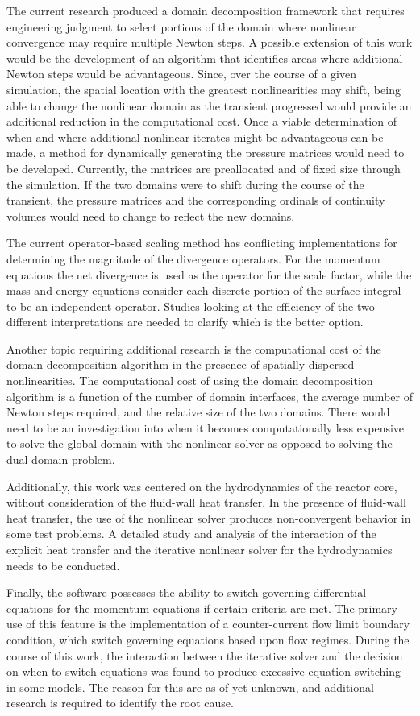 The current research produced a domain decomposition framework that requires engineering judgment to select portions of the domain where nonlinear convergence may require multiple Newton steps.
A possible extension of this work would be the development of an algorithm that identifies areas where additional Newton steps would be advantageous.
Since, over the course of a given simulation, the spatial location with the greatest nonlinearities may shift, being able to change the nonlinear domain as the transient progressed would provide an additional reduction in the computational cost.
Once a viable determination of when and where additional nonlinear iterates might be advantageous can be made, a method for dynamically generating the pressure matrices would need to be developed.
Currently, the matrices are preallocated and of fixed size through the simulation.
If the two domains were to shift during the course of the transient, the pressure matrices and the corresponding ordinals of continuity volumes would need to change to reflect the new domains.

The current operator-based scaling method has conflicting implementations for determining the magnitude of the divergence operators.
For the momentum equations the net divergence is used as the operator for the scale factor, while the mass and energy equations consider each discrete portion of the surface integral to be an independent operator.
Studies looking at the efficiency of the two different interpretations are needed to clarify which is the better option.

Another topic requiring additional research is the computational cost of the domain decomposition algorithm in the presence of spatially dispersed nonlinearities. 
The computational cost of using the domain decomposition algorithm is a function of the number of domain interfaces, the average number of Newton steps required, and the relative size of the two domains.
There would need to be an investigation into when it becomes computationally less expensive to solve the global domain with the nonlinear solver as opposed to solving the dual-domain problem.

Additionally, this work was centered on the hydrodynamics of the reactor core, without consideration of the fluid-wall heat transfer.
In the presence of fluid-wall heat transfer, the use of the nonlinear solver produces non-convergent behavior in some test problems.
A detailed study and analysis of the interaction of the explicit heat transfer and the iterative nonlinear solver for the hydrodynamics needs to be conducted.

Finally, the \cobra{} software possesses the ability to switch governing differential equations for the momentum equations if certain criteria are met.
The primary use of this feature is the implementation of a counter-current flow limit boundary condition, which switch governing equations based upon flow regimes.
During the course of this work, the interaction between the iterative solver and the decision on when to switch equations was found to produce excessive equation switching in some models.
The reason for this are as of yet unknown, and additional research is required to identify the root cause.